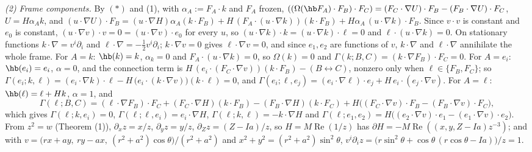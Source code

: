 \emph{(2) Frame components.} By $(*)$ and (1), with $\alpha_A := F_A \cdot k$ and $F_A$ frozen, $((\Omega(\hb F_A) \cdot F_B) \cdot F_C) = (F_C \cdot \nabla U) \cdot F_B - (F_B \cdot \nabla U) \cdot F_C$, $U = H\alpha_A k$, and $(u \cdot \nabla U) \cdot F_B = (u \cdot \nabla H)\alpha_A(k \cdot F_B) + H\,(F_A \cdot (u \cdot \nabla k))(k \cdot F_B) + H\alpha_A\,(u \cdot \nabla k) \cdot F_B$. Since $v \cdot v$ is constant and $e_0$ is constant, $(u \cdot \nabla v) \cdot v = 0 = (u \cdot \nabla v) \cdot e_0$ for every $u$, so $(u \cdot \nabla k) \cdot k = (u \cdot \nabla k) \cdot \ell = 0$ and $\ell \cdot (u \cdot \nabla k) = 0$. On stationary functions $k \cdot \nabla = v^i\partial_i$ and $\ell \cdot \nabla = -\tfrac12 v^i\partial_i$; $k \cdot \nabla v = 0$ gives $\ell \cdot \nabla v = 0$, and since $e_1, e_2$ are functions of $v$, $k \cdot \nabla$ and $\ell \cdot \nabla$ annihilate the whole frame. For $A = k$: $\hb(k) = k$, $\alpha_k = 0$ and $F_A \cdot (u \cdot \nabla k) = 0$, so $\Omega(k) = 0$ and $\Gamma(k; B, C) = (k \cdot \nabla F_B) \cdot F_C = 0$. For $A = e_i$: $\hb(e_i) = e_i$, $\alpha = 0$, and the connection term is $H\,(e_i \cdot (F_C \cdot \nabla v))(k \cdot F_B) - (B \leftrightarrow C)$, nonzero only when $\ell \in \{F_B, F_C\}$; so $\Gamma(e_i; k, \ell) = (e_i \cdot \nabla k) \cdot \ell - H\,\bigl(e_i \cdot (k \cdot \nabla v)\bigr)(k \cdot \ell) = 0$, and $\Gamma(e_i; \ell, e_j) = (e_i \cdot \nabla \ell) \cdot e_j + H\,e_i \cdot (e_j \cdot \nabla v)$. For $A = \ell$: $\hb(\ell) = \ell + Hk$, $\alpha = 1$, and
\[
\Gamma(\ell; B, C) = (\ell \cdot \nabla F_B) \cdot F_C + (F_C \cdot \nabla H)(k \cdot F_B) - (F_B \cdot \nabla H)(k \cdot F_C) + H\bigl((F_C \cdot \nabla v) \cdot F_B - (F_B \cdot \nabla v) \cdot F_C\bigr),
\]
which gives $\Gamma(\ell; k, e_i) = 0$, $\Gamma(\ell; \ell, e_i) = e_i \cdot \nabla H$, $\Gamma(\ell; k, \ell) = -k \cdot \nabla H$ and $\Gamma(\ell; e_1, e_2) = H\bigl((e_2 \cdot \nabla v) \cdot e_1 - (e_1 \cdot \nabla v) \cdot e_2\bigr)$. From $z^2 = w$ (Theorem (1)), $\partial_x z = x/z$, $\partial_y z = y/z$, $\partial_Z z = (Z - Ia)/z$, so $H = M\operatorname{Re}(1/z)$ has $\partial H = -M\operatorname{Re}((x, y, Z - Ia)z^{-3})$; and with $v = \bigl(rx + ay,\ ry - ax,\ (r^2 + a^2)\cos\theta\bigr)/(r^2 + a^2)$ and $x^2 + y^2 = (r^2 + a^2)\sin^2\theta$, $v^i\partial_i z = \bigl(r\sin^2\theta + \cos\theta\,(r\cos\theta - Ia)\bigr)/z = 1$.

